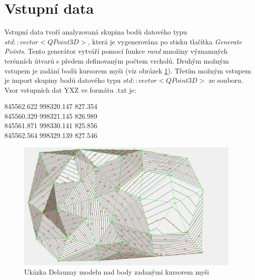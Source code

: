 \documentclass[a4paper,11pt,twoside]{article}
\begin{document}
\newpage
{}

\vspace*{-1cm}
\section{Vstupní data}
Vstupní data tvoří analyzovaná skupina bodů datového typu $std::vector<QPoint3D>$, která je vygenerována po stisku tlačítka \textit{Generate Points}. Tento generátor vytváří pomocí funkce \textit{rand} množiny významných terénních útvarů s předem definovaným počtem vrcholů. Druhým možným vstupem je zadání bodů kursorem myši (viz obrázek \ref{fig:contours_with_description}). Třetím možným vstupem je import skupiny bodů datového typu $std::vector<QPoint3D>$ ze souboru.  \\
Vzor vstupních dat YXZ ve formátu .txt je:
\begin{center}
845562.622	    998320.147     827.354\\
845560.329	    998321.145     826.989\\
845561.871	    998330.141     825.856\\ 
845562.564	    998329.139     827.546\\
\end{center}

\vspace{0.2cm}
\begin{figure}[hbt!] 
\begin{center}
\includegraphics[width=11cm]{pictures/contours_with_description.png} 
\caption[Ukázka Delaunay modelu nad body zadanými kursorem myši]{Ukázka Delaunay modelu nad body zadanými kursorem myši}
\label{fig:contours_with_description}
\end{center}
\end{figure}
\end{document}
